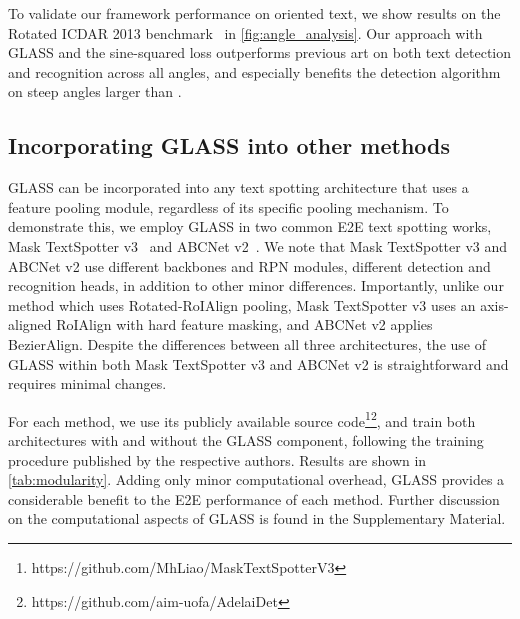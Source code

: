 \documentclass[runningheads]{llncs}
\begin{document}
To validate our framework performance on oriented text, we show results on the Rotated ICDAR 2013 benchmark~\cite{liao2020spotterV3} in \cref{fig:angle_analysis}.
Our approach with GLASS and the sine-squared loss outperforms previous art on both text detection and recognition across all angles, and especially benefits the detection algorithm on steep angles larger than .  

\subsection{Incorporating GLASS into other methods}
\label{sec:modularity}
GLASS can be incorporated into any text spotting architecture that uses a feature pooling module, regardless of its specific pooling mechanism.
To demonstrate this, we employ GLASS in two common E2E text spotting works, Mask TextSpotter v3~\cite{liao2020spotterV3} and ABCNet v2~\cite{liu2021abcnetV2}.
We note that Mask TextSpotter v3 and ABCNet v2 use different backbones and RPN modules, different detection and recognition heads, in addition to other minor differences.
Importantly, unlike our method which uses Rotated-RoIAlign pooling,  Mask TextSpotter v3 uses an axis-aligned RoIAlign with hard feature masking, and ABCNet v2 applies BezierAlign.
Despite the differences between all three architectures, the use of GLASS within 
both Mask TextSpotter v3 and ABCNet v2 is straightforward and requires minimal changes. 

For each method, we use its publicly available source code\footnote{https://github.com/MhLiao/MaskTextSpotterV3}\footnote{https://github.com/aim-uofa/AdelaiDet}, and train both architectures with and without the GLASS component, following the training procedure published by the respective authors.
Results are shown in \cref{tab:modularity}.
Adding only minor computational overhead, GLASS provides a considerable benefit to the E2E performance of each method.
Further discussion on the computational aspects of GLASS is found in the Supplementary Material.
\end{document}
